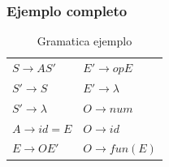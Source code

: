 \documentclass[12pt, twoside, openright]{report} %
\begin{document}
\pagebreak

\subsubsection{Ejemplo completo}

\begin{table}[H]
  \begin{tabular}{ll}
  $S \rightarrow A S'$      & $E' \rightarrow op E$     \\ 
  $S' \rightarrow S$        & $E' \rightarrow \lambda$  \\ 
  $S' \rightarrow \lambda$  & $O \rightarrow num$       \\ 
  $A\rightarrow id = E$     & $O \rightarrow id$        \\ 
  $E \rightarrow O E'$      & $O \rightarrow fun ( E )$ \\ 
  \end{tabular}
\caption{Gramatica ejemplo}
\end{table}
\end{document}
